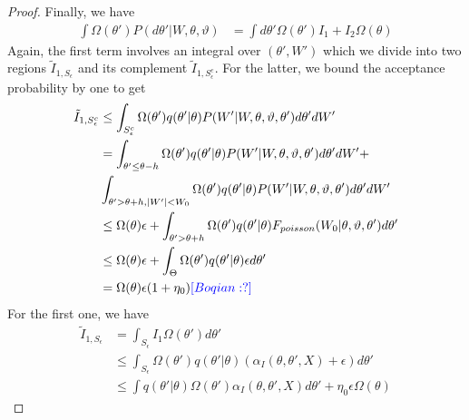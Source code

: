 \begin{proof}
Finally, we have
\begin{align*}
  \int \Omega(\theta') P(d\theta'| W, \theta, \vartheta)  
  &= \int d\theta' \Omega(\theta') I_1 + I_2 \Omega(\theta)
\end{align*}
Again, the first term involves an integral over $(\theta',W')$ which we 
divide into two regions $\tilde{I}_{1,S_\epsilon}$ and its complement 
$\tilde{I}_{1,S^c_\epsilon}$. For the latter, we bound the acceptance probability 
by one to get
\begin{align*}
  \tilde{I}_{1,S^c_\epsilon} &\le  \int_{S^c_\epsilon}  \Omega(\theta') q(\theta' | \theta)P(W' | W, \theta, \vartheta, \theta')d\theta'dW'\\
  &=  \int_{\theta' \leq \theta - h}  \Omega(\theta') q(\theta' | \theta)P(W' | W, \theta, \vartheta, \theta')d\theta'dW' + \\
&  \int_{\theta' > \theta + h, |W'| < W_0}  \Omega(\theta') q(\theta' | \theta)P(W' | W, \theta, \vartheta, \theta')d\theta'dW'\\
  & \leq  \Omega(\theta) \epsilon + \int_{\theta' > \theta + h} \Omega(\theta') q(\theta' | \theta)F_{poisson}(W_0 | \theta, \vartheta, \theta')d\theta'\\
  & \leq  \Omega(\theta) \epsilon + \int_{\Theta} \Omega(\theta') q(\theta' | \theta)\epsilon d\theta'\\
  &= \Omega(\theta) \epsilon (1 + \eta_0)
  \textcolor{blue}{[Boqian: ?]}
\end{align*}
For the first one, we have 
\begin{align*}
\tilde{I}_{1,S_\epsilon} &= \int_{S_\epsilon} I_1 \Omega(\theta') d\theta'\\
& \leq \int_{S_\epsilon} \Omega(\theta')q(\theta' | \theta) (\alpha_I(\theta, \theta', X) + \epsilon) d\theta' \\
& \leq \int q(\theta' | \theta) \Omega(\theta')\alpha_I(\theta, \theta', X) d\theta' + \eta_0 \epsilon \Omega(\theta)
\end{align*}


\end{proof}
